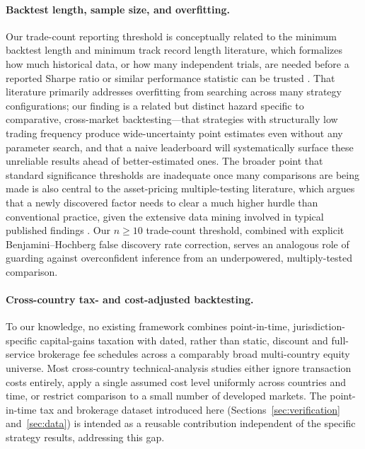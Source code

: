 \documentclass[11pt]{article}
\begin{document}
\paragraph{Backtest length, sample size, and overfitting.} Our trade-count reporting threshold is conceptually related to the minimum backtest length and minimum track record length literature, which formalizes how much historical data, or how many independent trials, are needed before a reported Sharpe ratio or similar performance statistic can be trusted \citep{bailey2014deflated, bailey2014pseudo}. That literature primarily addresses overfitting from searching across many strategy configurations; our finding is a related but distinct hazard specific to comparative, cross-market backtesting---that strategies with structurally low trading frequency produce wide-uncertainty point estimates even without any parameter search, and that a naive leaderboard will systematically surface these unreliable results ahead of better-estimated ones. The broader point that standard significance thresholds are inadequate once many comparisons are being made is also central to the asset-pricing multiple-testing literature, which argues that a newly discovered factor needs to clear a much higher hurdle than conventional practice, given the extensive data mining involved in typical published findings \citep{harvey2016}. Our $n \geq 10$ trade-count threshold, combined with explicit Benjamini--Hochberg false discovery rate correction, serves an analogous role of guarding against overconfident inference from an underpowered, multiply-tested comparison.

\paragraph{Cross-country tax- and cost-adjusted backtesting.} To our knowledge, no existing framework combines point-in-time, jurisdiction-specific capital-gains taxation with dated, rather than static, discount and full-service brokerage fee schedules across a comparably broad multi-country equity universe. Most cross-country technical-analysis studies either ignore transaction costs entirely, apply a single assumed cost level uniformly across countries and time, or restrict comparison to a small number of developed markets. The point-in-time tax and brokerage dataset introduced here (Sections~\ref{sec:verification} and~\ref{sec:data}) is intended as a reusable contribution independent of the specific strategy results, addressing this gap.
\end{document}

